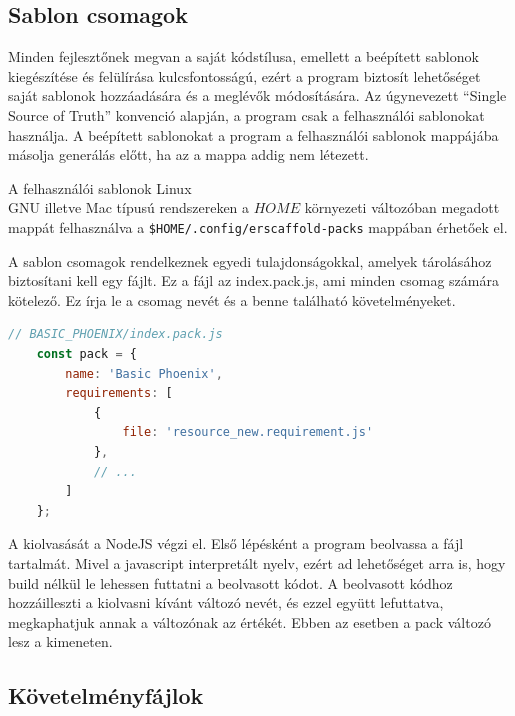 \documentclass[a4paper,12pt,oneside]{report}
\begin{document}
\newpage
\subsection{Sablon csomagok}

\begin{justify}

	Minden fejlesztőnek megvan a saját kódstílusa, emellett a beépített sablonok kiegészítése és felülírása kulcsfontosságú, ezért a program biztosít lehetőséget saját sablonok hozzáadására és a meglévők módosítására. Az úgynevezett ``Single Source of Truth'' konvenció alapján, a program csak a felhasználói sablonokat használja. A beépített sablonokat a program a felhasználói sablonok mappájába másolja generálás előtt, ha az a mappa addig nem létezett.

	A felhasználói sablonok Linux\\GNU illetve Mac típusú rendszereken a $HOME$ környezeti változóban megadott mappát felhasználva a \lstinline[]!$HOME/.config/erscaffold-packs! mappában érhetőek el. 

	A sablon csomagok rendelkeznek egyedi tulajdonságokkal, amelyek tárolásához biztosítani kell egy fájlt. Ez a fájl az index.pack.js, ami minden csomag számára kötelező. Ez írja le a csomag nevét és a benne található követelményeket.

	\begin{lstlisting}[language=javascript]
	// BASIC_PHOENIX/index.pack.js
	const pack = {
		name: 'Basic Phoenix',
		requirements: [
			{
				file: 'resource_new.requirement.js'
			},
			// ...
		]
	};
	\end{lstlisting}

	A kiolvasását a NodeJS végzi el. Első lépésként a program beolvassa a fájl tartalmát. Mivel a javascript interpretált nyelv, ezért ad lehetőséget arra is, hogy build nélkül le lehessen futtatni a beolvasott kódot. A beolvasott kódhoz hozzáilleszti a kiolvasni kívánt változó nevét, és ezzel együtt lefuttatva, megkaphatjuk annak a változónak az értékét. Ebben az esetben a pack változó lesz a kimeneten.  

\end{justify}

\newpage
\subsection{Követelményfájlok}
\end{document}
